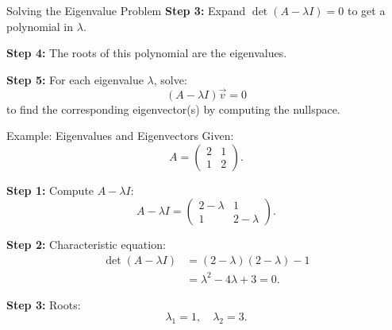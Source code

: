 \documentclass{beamer}
\begin{document}
	\begin{frame}{Solving the Eigenvalue Problem}
	\textbf{Step 3:} Expand \(\det(A - \lambda I) = 0\) to get a polynomial in \(\lambda\).

	\textbf{Step 4:} The roots of this polynomial are the eigenvalues.

	\textbf{Step 5:} For each eigenvalue \(\lambda\), solve:
		\begin{equation}
		(A - \lambda I)\vec{v} = 0
		\end{equation}
	to find the corresponding eigenvector(s) by computing the nullspace.
	\end{frame}

	\begin{frame}{Example: Eigenvalues and Eigenvectors}
	Given:
		\begin{equation}
		A =
		\begin{pmatrix} 2 & 1 \\ 1 & 2 \end{pmatrix}.
		\end{equation}

	\textbf{Step 1:} Compute \(A - \lambda I\):
		\begin{equation}
		A - \lambda I =
		\begin{pmatrix} 2-\lambda & 1 \\ 1 & 2-\lambda \end{pmatrix}.
		\end{equation}

	\textbf{Step 2:} Characteristic equation:
		\begin{align}
		\det(A-\lambda I) &= (2-\lambda)(2-\lambda) -1 \\
		&= \lambda^2 -4\lambda+3 =0.
		\end{align}

	\textbf{Step 3:} Roots:
		\begin{equation}
		\lambda_1 = 1, \quad \lambda_2 = 3.
		\end{equation}
	\end{frame}
\end{document}
